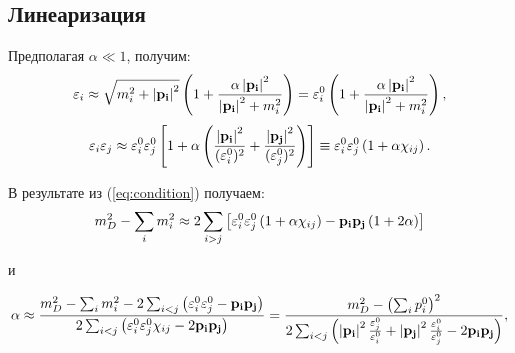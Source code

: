 \documentclass[a4paper,10pt]{article}
\newcommand{\pimodsq}{\ensuremath{\left|{\bf p_i}\right|^2}\xspace}
\newcommand{\pjmodsq}{\ensuremath{\left|{\bf p_j}\right|^2}\xspace}
\begin{document}
\subsection{Линеаризация}
Предполагая $\alpha\ll1$, получим:
\begin{equation}
 \varepsilon_i \approx \sqrt{m_i^2+\pimodsq}\left(1+\frac{\alpha\pimodsq}{\pimodsq+m_i^2}\right)=\varepsilon^0_i\left(1+\frac{\alpha\pimodsq}{\pimodsq+m_i^2}\right),
\end{equation}
\begin{equation}
 \varepsilon_i\varepsilon_j\approx \varepsilon^0_i\varepsilon^0_j\left[1+\alpha\left(\frac{\pimodsq}{(\varepsilon^0_i)^2}+\frac{\pjmodsq}{(\varepsilon^0_j)^2}\right)\right] \equiv \varepsilon^0_i\varepsilon^0_j\left(1+\alpha\chi_{ij}\right).
\end{equation}

В результате из (\ref{eq:condition}) получаем:
\begin{equation}
 m_D^2-\sum_i m_i^2 \approx 2\sum_{i>j}\left[\varepsilon^0_i\varepsilon^0_j\left(1+\alpha\chi_{ij}\right)-{\bf p_i}{\bf p_j}\left(1+2\alpha\right)\right]
\end{equation}

и

\begin{equation}
 \alpha \approx \frac{m_D^2-\sum_i m_i^2-2\sum_{i<j}\left(\varepsilon^0_i\varepsilon^0_j-{\bf p_i}{\bf p_j}\right)}{2\sum_{i<j}\left(\varepsilon^0_i\varepsilon^0_j\chi_{ij}-2{\bf p_i}{\bf p_j}\right)}=\frac{m_D^2-\left(\sum_ip_i^0\right)^2}{2\sum_{i<j}\left(\pimodsq\frac{\varepsilon^0_j}{\varepsilon^0_i}+\pjmodsq\frac{\varepsilon^0_i}{\varepsilon^0_j}-2{\bf p_i}{\bf p_j}\right)},
\end{equation}
\end{document}
